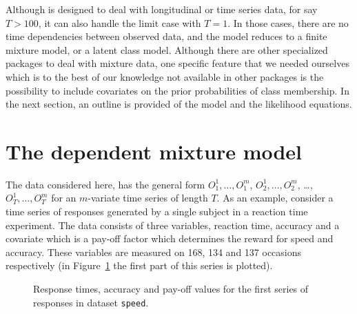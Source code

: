 \documentclass[article]{jss}
\begin{document}
Although  is designed to deal with longitudinal or time
series data, for say $T>100$, it can also handle the limit case with
$T=1$.  In those cases, there are no time dependencies between
observed data, and the model reduces to a finite mixture model, or a
latent class model.  Although there are other specialized packages to
deal with mixture data, one specific feature that we needed ourselves
which is to the best of our knowledge not available in other packages
is the possibility to include covariates on the prior probabilities of
class membership.  In the next section, an outline is provided of the
model and the likelihood equations.


\section{The dependent mixture model}

The data considered here, has the general form $O_{1}^{1}, \ldots,
O_{1}^{m}$, $O_{2}^{1}, \ldots, O_{2}^{m}$, \ldots, $O_{T}^{1},
\ldots, O_{T}^{m}$ for an $m$-variate time series of length $T$.  As
an example, consider a time series of responses generated by a single
subject in a reaction time experiment.  The data consists of three
variables, reaction time, accuracy and a covariate which is a pay-off
factor which determines the reward for speed and accuracy.  These
variables are measured on 168, 134 and 137 occasions respectively (in
Figure~\ref{fig:speed} the first part of this series is plotted).

\begin{figure}[htbp]
  \begin{center}
	  \caption{Response times, accuracy and pay-off values for
	  the first series of responses in dataset \texttt{speed}.}
	  \label{fig:speed}
  \end{center}
\end{figure}
\end{document}
